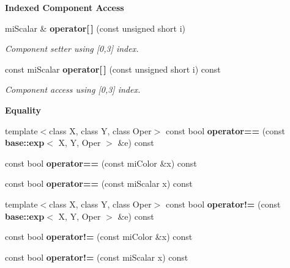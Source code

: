 \begin{Indent}{\bf Indexed Component Access}\par
\begin{CompactItemize}
\item 
mi\-Scalar \& {\bf operator[$\,$]} (const unsigned short i)
\begin{CompactList}\small\item\em Component setter using [0,3] index. \item\end{CompactList}\item 
const mi\-Scalar {\bf operator[$\,$]} (const unsigned short i) const 
\begin{CompactList}\small\item\em Component access using [0,3] index. \item\end{CompactList}\end{CompactItemize}
\end{Indent}
\begin{Indent}{\bf Equality}\par
\begin{CompactItemize}
\item 
template$<$class X, class Y, class Oper$>$ const bool {\bf operator==} (const {\bf base::exp}$<$ X, Y, Oper $>$ \&e) const 
\item 
const bool {\bf operator==} (const mi\-Color \&x) const 
\item 
const bool {\bf operator==} (const mi\-Scalar x) const 
\item 
template$<$class X, class Y, class Oper$>$ const bool {\bf operator!=} (const {\bf base::exp}$<$ X, Y, Oper $>$ \&e) const 
\item 
const bool {\bf operator!=} (const mi\-Color \&x) const 
\item 
const bool {\bf operator!=} (const mi\-Scalar x) const 
\end{CompactItemize}
\end{Indent}

